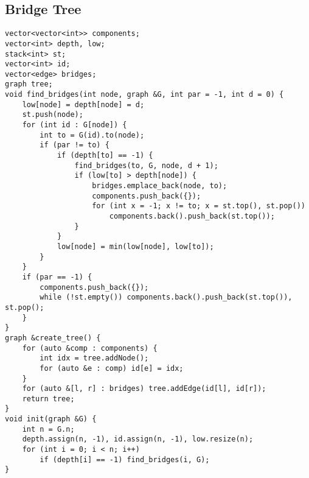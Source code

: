 \documentclass[FSZ,a4paper,onesided]{article}
\begin{document}
\begin{multicols*}{\COLS}
\subsection{Bridge Tree}
\begin{lstlisting}
vector<vector<int>> components;
vector<int> depth, low;
stack<int> st;
vector<int> id;
vector<edge> bridges;
graph tree;
void find_bridges(int node, graph &G, int par = -1, int d = 0) {
    low[node] = depth[node] = d;
    st.push(node);
    for (int id : G[node]) {
        int to = G(id).to(node);
        if (par != to) {
            if (depth[to] == -1) {
                find_bridges(to, G, node, d + 1);
                if (low[to] > depth[node]) {
                    bridges.emplace_back(node, to);
                    components.push_back({});
                    for (int x = -1; x != to; x = st.top(), st.pop())
                        components.back().push_back(st.top());
                }
            }
            low[node] = min(low[node], low[to]);
        }
    }
    if (par == -1) {
        components.push_back({});
        while (!st.empty()) components.back().push_back(st.top()), st.pop();
    }
}
graph &create_tree() {
    for (auto &comp : components) {
        int idx = tree.addNode();
        for (auto &e : comp) id[e] = idx;
    }
    for (auto &[l, r] : bridges) tree.addEdge(id[l], id[r]);
    return tree;
}
void init(graph &G) {
    int n = G.n;
    depth.assign(n, -1), id.assign(n, -1), low.resize(n);
    for (int i = 0; i < n; i++)
        if (depth[i] == -1) find_bridges(i, G);
}
\end{lstlisting}

\end{multicols*}
\end{document}
